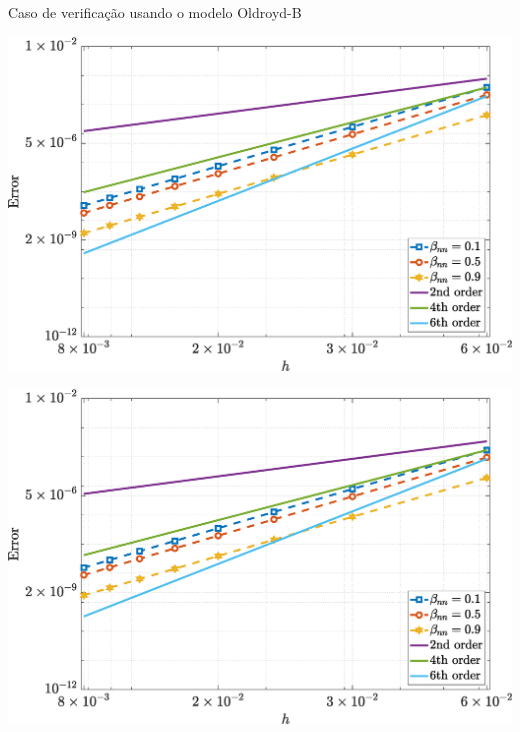 \begin{frame}{Caso de verificação usando o modelo Oldroyd-B}
    \centering
    \captionsetup{justification=centering}
    \label{fig:oldroydb_3}
    \begin{minipage}{0.325\textwidth}
        \centering
        \includegraphics[width=\textwidth]{Figures/NormErr_2nd_Re_100_Wi_1_epsilon_0_xi_0_alphaG_0_Dt_1e-06_at_0.05_tipsim_1_MMS_12_Txx.eps}
        \label{oldroydb_txx_Case11}
    \end{minipage}
    \hfill
    \begin{minipage}{0.325\textwidth}
        \centering
        \includegraphics[width=\textwidth]{Figures/NormErr_2nd_Re_100_Wi_1_epsilon_0_xi_0_alphaG_0_Dt_1e-06_at_0.05_tipsim_1_MMS_12_Txy.eps}

\end{minipage}
\end{frame}
